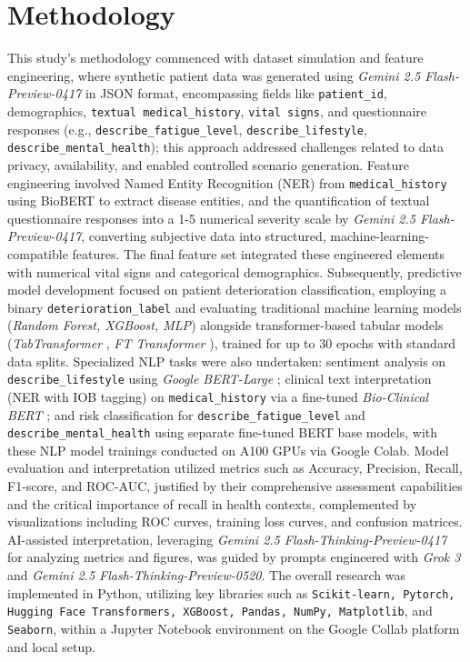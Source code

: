 \section{Methodology}

This study's methodology commenced with dataset simulation and feature engineering, where synthetic patient data was generated using \textit{Gemini 2.5 Flash-Preview-0417} \parencite{Doshi_2025} in JSON format, encompassing fields like \texttt{patient\_id}, demographics, \texttt{textual medical\_history}, \texttt{vital signs}, and questionnaire responses (e.g., \texttt{describe\_fatigue\_level}, \texttt{describe\_lifestyle}, \texttt{describe\_mental\_health}); this approach addressed challenges related to data privacy, availability, and enabled controlled scenario generation. Feature engineering involved Named Entity Recognition (NER) from \texttt{medical\_history} using BioBERT \parencite{Lee_2019} to extract disease entities, and the quantification of textual questionnaire responses into a 1-5 numerical severity scale by \textit{Gemini 2.5 Flash-Preview-0417}, converting subjective data into structured, machine-learning-compatible features. The final feature set integrated these engineered elements with numerical vital signs and categorical demographics. Subsequently, predictive model development focused on patient deterioration classification, employing a binary \texttt{deterioration\_label} and evaluating traditional machine learning models (\textit{Random Forest, XGBoost, MLP}) alongside transformer-based tabular models (\textit{TabTransformer} \parencite{huang2020tabtransformertabulardatamodeling}, \textit{FT Transformer} \parencite{gorishniy2023revisitingdeeplearningmodels}), trained for up to 30 epochs with standard data splits. Specialized NLP tasks were also undertaken: sentiment analysis on \texttt{describe\_lifestyle} using \textit{Google BERT-Large} \parencite{devlin2019bertpretrainingdeepbidirectional}; clinical text interpretation (NER with IOB tagging) on \texttt{medical\_history} via a fine-tuned \textit{Bio-Clinical BERT} \parencite{ling2023bioclinicalbertbertbase}; and risk classification for \texttt{describe\_fatigue\_level} and \texttt{describe\_mental\_health} using separate fine-tuned BERT base models, with these NLP model trainings conducted on A100 GPUs via Google Colab. Model evaluation and interpretation utilized metrics such as Accuracy, Precision, Recall, F1-score, and ROC-AUC, justified by their comprehensive assessment capabilities and the critical importance of recall in health contexts, complemented by visualizations including ROC curves, training loss curves, and confusion matrices. AI-assisted interpretation, leveraging \textit{Gemini 2.5 Flash-Thinking-Preview-0417} for analyzing metrics and figures, was guided by prompts engineered with \textit{Grok 3} \parencite{xGrokBeta} and \textit{Gemini 2.5 Flash-Thinking-Preview-0520}. The overall research was implemented in Python, utilizing key libraries such as \texttt{Scikit-learn, Pytorch, Hugging Face Transformers, XGBoost, Pandas, NumPy, Matplotlib}, and \texttt{Seaborn}, within a Jupyter Notebook environment on the Google Collab platform and local setup.